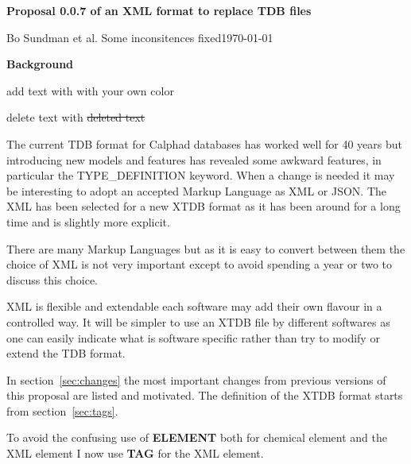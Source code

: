 \documentclass{article}
\begin{document}
\begin{center}

  {\Large \bf Proposal 0.0.7 of an XML format to replace TDB files}

  Bo Sundman et al. Some inconsitences fixed\today
  


  \vspace{5mm}

  {\large \bf Background}

\end{center}

add text with {\color{red} with your own color}

delete text with \sout{deleted text}

\bigskip

The current TDB format for Calphad databases has worked well for 40
years but introducing new models and features has revealed some
awkward features, in particular the TYPE\_DEFINITION keyword.  When a
change is needed it may be interesting to adopt an accepted Markup
Language as XML or JSON.  The XML has been selected for a new XTDB
format as it has been around for a long time and is slightly more
explicit.

There are many Markup Languages but as it is easy to convert between
them the choice of XML is not very important except to avoid spending
a year or two to discuss this choice.

XML is flexible and extendable each software may add their own flavour
in a controlled way.  It will be simpler to use an XTDB file by
different softwares as one can easily indicate what is software
specific rather than try to modify or extend the TDB format.

In section~\ref{sec:changes} the most important changes from previous
versions of this proposal are listed and motivated.  The definition of
the XTDB format starts from section~\ref{sec:tags}.

To avoid the confusing use of {\bf ELEMENT} both for chemical element
and the XML element I now use {\bf TAG} for the XML element.
\end{document}
